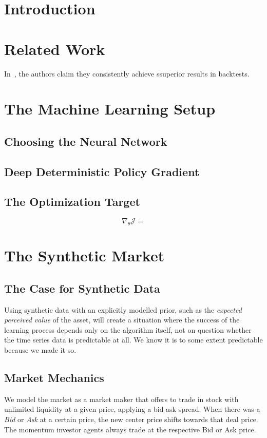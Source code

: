 \documentclass{article}
\begin{document}
	\section{Introduction}
	\section{Related Work}
		In~\cite{Jiang2017}, the authors claim they consistently achieve ssuperior results in backtests.
	
	\section{The Machine Learning Setup}

	\subsection{Choosing the Neural Network}	
	\subsection{Deep Deterministic Policy Gradient}
	\subsection{The Optimization Target}
	
	\begin{equation}
		\nabla_\theta \mathcal{J} =
	\end{equation}
	
	\section{The Synthetic Market}
	\subsection{The Case for Synthetic Data}
	Using synthetic data with an explicitly modelled prior, such as the \emph{expected perceived value} of the asset, will create a situation where the success of the learning process depends only on the algorithm itself, not on question whether the time series data is predictable at all. We know it is to some extent predictable because we made it so. 
	\subsection{Market Mechanics}
	We model the market as a market maker that offers to trade in stock with unlimited liquidity at a given price, applying a bid-ask spread. When there was a \emph{Bid} or \emph{Ask} at a certain price, the new center price shifts towards that deal price. The momentum investor agents always trade at the respective Bid or Ask price.
\end{document}
